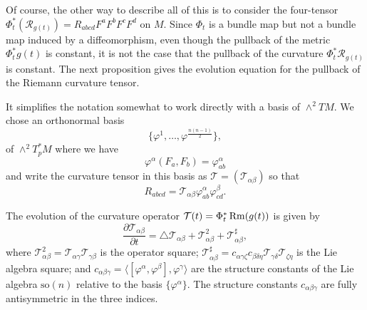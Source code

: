 Of course, the other way to describe all of this  is to consider the
four-tensor $\Phi_t^*({\mathcal R}_{g(t)})=R_{abcd}F^aF^bF^cF^d$ on
$M$. Since $\Phi_t$ is a bundle map but not a bundle map induced by
a diffeomorphism, even though the pullback of the metric
$\Phi_t^*g(t)$ is constant, it is not the case that the pullback of
the curvature $\Phi_t^*{\mathcal R}_{g(t)}$ is constant.
 The next proposition gives the evolution equation for the pullback
 of the Riemann curvature tensor.



It simplifies the notation somewhat to work directly with a basis of
$\wedge^2TM$. We chose an orthonormal basis
$$\{\varphi^{1},\ldots,\varphi^{\frac{n(n-1)}{2}}\},$$
of $\wedge^2T^*_pM$ where  we have \[ \varphi^{\alpha}(F_{a},F_{b})
= \varphi^{\alpha}_{ab} \] and write the curvature tensor in this
basis as ${\mathcal T} = ({\mathcal T}_{\alpha\beta})$ so that
\begin{equation}\label{Mdefn}
R_{abcd}={\mathcal
T}_{\alpha\beta}\varphi^{\alpha}_{ab}\varphi^{\beta}_{cd}.\end{equation}


\begin{proposition}\label{prop:curvature-operator-evolution}

\label{Mevol}

The evolution of the curvature operator ${\mathcal
T}(t)=\Phi_t^*\operatorname{Rm}(g(t))$ is given by
\[ \frac{\partial {\mathcal T}_{\alpha\beta}}{\partial t} = \triangle
{\mathcal T}_{\alpha\beta} + {\mathcal T}^{2}_{\alpha\beta} +
{\mathcal T}^{\sharp}_{\alpha\beta},
\] where ${\mathcal T}^{2}_{\alpha\beta}={\mathcal T}_{\alpha\gamma}{\mathcal
T}_{\gamma\beta}$ is the operator square; ${\mathcal T}^{\sharp}_{\alpha\beta}
 =
c_{\alpha\gamma\zeta}c_{\beta\delta\eta}{\mathcal T}_{\gamma\delta}{\mathcal
T}_{\zeta\eta}$ is the Lie algebra square; and $c_{\alpha\beta\gamma} =
\langle[\varphi^{\alpha},\varphi^{\beta}],\varphi^{\gamma}\rangle $ are the
structure constants of the Lie algebra $\mathrm{so}(n)$ relative to the basis
$\{\varphi^{\alpha}\}$. The structure constants $c_{\alpha\beta\gamma}$  are
fully antisymmetric in the three indices.
\end{proposition}

